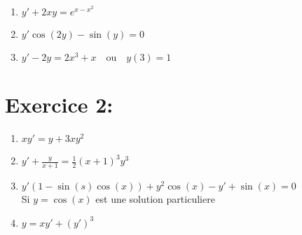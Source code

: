 \documentclass[a4paper,12pt]{article}
\begin{document}
\begin{enumerate}
	\item $y' + 2xy = e^{x-x^2}$

	\item $y' \cos(2y) - \sin(y) = 0$

	\item $y' - 2y = 2x^3 + x \quad \text{ou} \quad y(3)=1$
\end{enumerate}

\section*{Exercice 2:}
\begin{enumerate}
	\item $xy' = y + 3xy^2$
	\item $y' + \frac{y}{x+1} = \frac{1}{2} (x+1)^3 y^3$
	\item $y' (1 -\sin(s)\cos(x)) + y^2\cos(x) -y' + \sin(x) = 0$ \\ Si $y = \cos(x)$ est une solution particuliere
	\item $y = xy' + (y')^3$
\end{enumerate}
\end{document}
